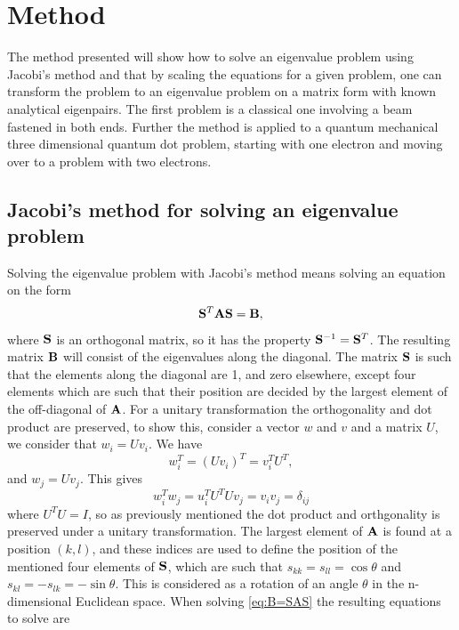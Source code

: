 \documentclass{emulateapj}
\begin{document}
\section{Method}
\label{sec:method}
The method presented will show how to solve an eigenvalue problem using Jacobi's method and that by scaling the equations for a given problem, one can transform the problem to an eigenvalue problem on a matrix form with known analytical eigenpairs. The first problem is a classical one involving a beam fastened in both ends. Further the method is applied to a quantum mechanical three dimensional quantum dot problem, starting with one electron and moving over to a problem with two electrons.

\subsection{Jacobi's method for solving an eigenvalue problem}
Solving the eigenvalue problem with Jacobi's method means solving an equation on the form
%
\begin{gather}\label{eq:B=SAS}
    \bold{S}^T\bold{A}\bold{S} = \bold{B},
\end{gather}
%
where $\bold{S}$ is an orthogonal matrix, so it has the property $\bold{S}^{-1} = \bold{S}^T$. The resulting matrix $\bold{B}$ will consist of the eigenvalues along the diagonal. The matrix $\bold{S}$ is such that the elements along the diagonal are 1, and zero elsewhere, except four elements which are such that their position are decided by the largest element of the off-diagonal of $\bold{A}$. For a unitary transformation the orthogonality and dot product are preserved, to show this, consider a vector $w$ and $v$ and a matrix $U$, we consider that $w_i = Uv_i$. We have 
%
\begin{equation*}
    w_i^T = \left(Uv_i\right)^T = v_i^TU^T,
\end{equation*}
%
and $w_j = Uv_j$. This gives
%
\begin{equation*}
    w_i^Tw_j = u_i^TU^T U v_j = v_iv_j = \delta_{ij}
\end{equation*}
%
where $U^T U = I$, so as previously mentioned the dot product and orthgonality is preserved under a unitary transformation. The largest element of $\bold{A}$ is found at a position $(k,l)$, and these indices are used to define the position of the mentioned four elements of $\bold{S}$, which are such that $s_{kk} = s_{ll} = \cos\theta$ and $s_{kl} = -s_{lk} = -\sin\theta$. This is considered as a rotation of an angle $\theta$ in the n-dimensional Euclidean space. When solving \eqref{eq:B=SAS} the resulting equations to solve are
\end{document}

